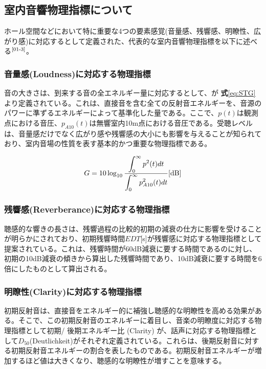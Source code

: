\subsection{室内音響物理指標について}
ホール空間などにおいて特に重要な4つの要素感覚(音量感、残響感、明瞭性、広がり感)に対応するとして定義された、代表的な室内音響物理指標を以下に述べる$^{\text{\cite{01-3}}}$。

\subsubsection{音量感(Loudness)に対応する物理指標}
音の大きさは、到来する音の全エネルギー量に対応するとして、\STG が \textbf{式}\ref{eq:STG}より定義されている。これは、直接音を含む全ての反射音エネルギーを、音源のパワーに準ずるエネルギーによって基準化した量である。ここで、$p(t)$は観測点における音圧、$p_{A10}(t)$は無響室内10m点における音圧である。受聴レベルは、音量感だけでなく広がり感や残響感の大小にも影響を与えることが知られており、室内音場の性質を表す基本的かつ重要な物理指標である。

\begin{equation}
  \label{eq:STG}
  G = 10\log_{10}{\frac{\displaystyle\int_0^{\infty}p^2(t)dt}{\displaystyle\int_0^{\infty}p_{A10}^2(t)dt}} \textrm{[dB]}
\end{equation}

\subsubsection{残響感(Reverberance)に対応する物理指標}
聴感的な響きの長さは、残響過程の比較的初期の減衰の仕方に影響を受けることが明らかにされており、初期残響時間$EDT$[s]が残響感に対応する物理指標として提案されている。これは、残響時間が60dB減衰に要する時間であるのに対し、初期の10dB減衰の傾きから算出した残響時間であり、10dB減衰に要する時間を6倍にしたものとして算出される。

\subsubsection{明瞭性(Clarity)に対応する物理指標}
初期反射音は、直接音をエネルギー的に補強し聴感的な明瞭性を高める効果がある。そこで、この初期反射音のエネルギーに着目し、音楽の明瞭度に対応する物理指標として初期/ 後期エネルギー比 \Clarity(Clarity) が、話声に対応する物理指標として$D_{50}$(Deutlichkeit)がそれぞれ定義されている。これらは、後期反射音に対する初期反射音エネルギーの割合を表したものである。初期反射音エネルギーが増加するほど値は大きくなり、聴感的な明瞭性が増すことを意味する。

